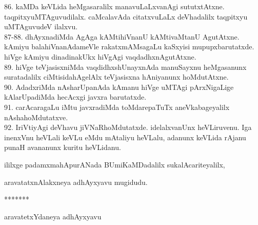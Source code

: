 \documentclass{article}
\begin{document}
86. kaMDa keVLida heMgasaralilx manavuLaLxvanAgi sututxtAtxne. taqpitxyuMTAguvudilalx. caMcalavAda citatxvuLaLx deVhadalilx taqpitxyu uMTAguvudeV ilalxvu.\\
87-88. dhAyxnadiMda AgAga kAMtihiVnanU kAMtivaMtanU AgutAtxne. kAmiyu balahiVnanAdameVle rakatxmAMsagaLu kaSxyisi mupupxbarutatxde. hiVge kAmiyu dinadinakUkx hiVgAgi vaqdadhxnAgutAtxne.\\
89. hiVge teVjasisxniMda vaqdidhxshUnayxnAda manuSayxnu heMgasanunx suratadalilx ciMtisidahAgelAlx teVjasisxna hAniyanunx hoMdutAtxne.\\
90. AdadxriMda nAsharUpanAda kAmanu hiVge uMTAgi pArxNigaLige kAlarUpadiMda hecAcxgi javxra barutatxde.\\
91. carAcaragaLu iMtu javxradiMda toMdarepaTuTx aneVkabageyalilx nAshahoMdutatxve.\\
92. IriVtiyAgi deVhavu jiVNaRhoMdutatxde. idelalxvanUnx heVLiruvenu. Iga inenxVnu heVLali keVLu eMdu mAtaliyu heVLalu, adanunx keVLida rAjanu punaH avananunx kuritu heVLidanu.\\

\begin{center}
ililxge padamxmahApurANada BUmiKaMDadalilx sukalAcariteyalilx,
\end{center}

\begin{center}
aravatatxnAlakxneya adhAyxyavu mugidudu.
\end{center}

\begin{center}
*******
\end{center}

\begin{center}
aravatetxYdaneya adhAyxyavu
\end{center}
\end{document}
